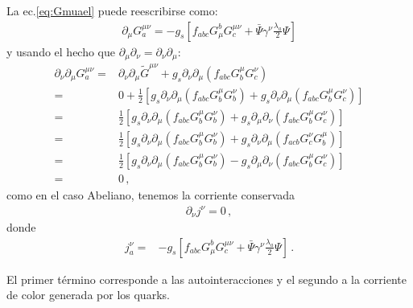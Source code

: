 La ec.\eqref{eq:Gmuael} puede reescribirse como:
\begin{align}
  \partial_\mu G^{\mu\nu}_a=-g_s\left[f_{abc}G^b_\mu G^{\mu\nu}_c+\bar{\Psi}\gamma^\nu\frac{\lambda_a}{2}\Psi  \right]
\end{align}
y usando el hecho que $\partial_\mu\partial_\nu=\partial_\nu\partial_\mu$:
\begin{align}
  \partial_\nu\partial_\mu G^{\mu\nu}_a=&\partial_\nu\partial_\mu\widetilde{G}^{\mu\nu}+g_s\partial_\nu\partial_\mu\left(f_{abc}G^\mu_bG^\nu_c\right)\nonumber\\
=&0+\frac{1}{2}\left[g_s\partial_\nu\partial_\mu\left(f_{abc}G^\mu_bG^\nu_b\right)+g_s\partial_\nu\partial_\mu\left(f_{abc}G^\mu_bG^\nu_c\right)\right]\nonumber\\
=&\frac{1}{2}\left[g_s\partial_\nu\partial_\mu\left(f_{abc}G^\mu_bG^\nu_b\right)+g_s\partial_\mu\partial_\nu\left(f_{abc}G^\mu_bG^\nu_c\right)\right]\nonumber\\
=&\frac{1}{2}\left[g_s\partial_\nu\partial_\mu\left(f_{abc}G^\mu_bG^\nu_b\right)+g_s\partial_\nu\partial_\mu\left(f_{acb}G^\nu_cG^\mu_b\right)\right]\nonumber\\
=&\frac{1}{2}\left[g_s\partial_\nu\partial_\mu\left(f_{abc}G^\mu_bG^\nu_b\right)-g_s\partial_\mu\partial_\nu\left(f_{abc}G^\mu_bG^\nu_c\right)\right]\nonumber\\
=&0\,,
\end{align}
como en el caso Abeliano, tenemos la corriente conservada
\begin{align}
  \partial_\nu j^\nu=0\,,
\end{align}
donde
\begin{align}
\label{eq:jnuqcd}
  j^\nu_a=&-g_s\left[f_{abc}G^b_\mu G^{\mu\nu}_c+\bar{\Psi}\gamma^\nu\frac{\lambda_a}{2}\Psi  \right]\,.
\end{align}

El primer término corresponde a las autointeracciones y el segundo a la corriente de color generada por los quarks.


\renewcommand{\labelenumi}{\theenumi} %

%
